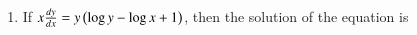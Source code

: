 \documentclass[journal]{IEEEtran}
\begin{document}
\begin{enumerate}
	\item If $x\frac{d{y}}{d{x}}=y\left(\log y - \log x +1\right)$, then the solution of the equation is 
		\hfill{}
		\begin{enumerate}
		\end{enumerate}
\end{enumerate}
\end{document}
